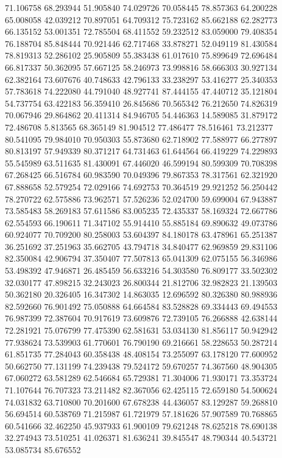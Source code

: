 71.106758
68.293944
51.905840
74.029726
70.058445
78.857363
64.200228
65.008058
42.039212
70.897051
64.709312
75.723162
85.662188
62.282773
66.135152
53.001351
72.785504
68.411552
59.232512
83.059000
79.408354
76.188704
85.848444
70.921446
62.717468
33.878271
52.049119
81.430584
78.819313
52.286102
25.905809
55.383438
61.017610
75.899649
72.696484
66.817337
50.362095
57.667125
58.246973
73.998816
58.666303
30.927134
62.382164
73.607676
40.748633
42.796133
33.238297
53.416277
25.340353
57.783618
74.222080
44.791040
48.927741
87.444155
47.440712
35.121804
54.737754
63.422183
56.359410
26.845686
70.565342
76.212650
74.826319
70.067946
29.864862
20.411314
84.946705
54.446363
14.589085
31.879172
72.486708
5.813565
68.365149
81.904512
77.486477
78.516461
73.212377
80.541095
79.984010
70.950303
55.873680
62.718902
77.588977
66.277897
80.813197
57.949339
80.371217
64.731463
61.644564
66.419229
74.229893
55.545989
63.511635
81.430091
67.446020
46.599194
80.599309
70.708398
67.268425
66.516784
60.983590
70.049396
79.867353
78.317561
62.321920
67.888658
52.579254
72.029166
74.692753
70.364519
29.921252
56.250442
78.270722
62.575886
73.962571
57.526236
52.024700
59.699004
67.943887
73.585483
58.269183
57.611586
83.005235
72.435337
58.169324
72.667786
62.554593
66.190611
71.347102
55.914410
55.885184
69.890632
49.073786
60.924077
70.709200
80.258003
53.604397
84.180178
63.478961
65.251387
36.251692
37.251963
35.662705
43.794718
34.840477
62.969859
29.831106
82.350084
42.906794
37.350407
77.507813
65.041309
62.075155
56.346986
53.498392
47.946871
26.485459
56.633216
54.303580
76.809177
33.502302
32.030177
47.898215
32.243023
26.800344
21.812706
32.982823
21.139503
50.362180
20.326405
16.347302
14.863035
12.696592
80.326380
80.988936
82.592660
76.901492
75.050888
64.664584
83.528828
69.334443
69.494553
76.987399
72.387604
70.917619
73.609876
72.739105
76.266888
42.638144
72.281921
75.076799
77.475390
62.581631
53.034130
81.856117
50.942942
77.938624
73.539903
61.770601
76.790190
69.216661
58.228653
50.287214
61.851735
77.284043
60.358438
48.408154
73.255097
63.178120
77.600952
50.662750
77.131199
74.239438
79.524172
59.670257
74.367560
48.904305
67.060272
63.581289
62.546684
65.729381
71.304006
71.930171
73.353724
71.107644
76.707323
73.211482
82.367056
62.425115
72.659180
54.500624
74.031832
63.710800
70.201600
67.678238
44.436057
83.129287
59.268810
56.694514
60.538769
71.215987
61.721979
57.181626
57.907589
70.768865
60.541666
32.462250
45.937933
61.900109
79.621248
78.625218
78.690138
32.274943
73.510251
41.026371
81.636241
39.845547
48.790344
40.543721
53.085734
85.676552
